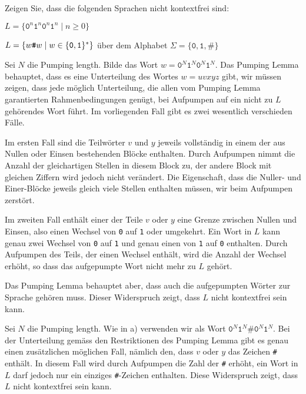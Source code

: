 Zeigen Sie, dass die folgenden Sprachen nicht kontextfrei sind:
\begin{teilaufgaben}
\item $L=\{\texttt{0}^n\texttt{1}^n\texttt{0}^n\texttt{1}^n\;|\;n\ge 0\}$
\item $L=\{w{\texttt{\#}}w\;|\;w\in\{{\tt 0},{\tt 1}\}^*\}$ über dem Alphabet
$\Sigma=\{\texttt{0},\texttt{1},\texttt{\#}\}$
\end{teilaufgaben}

\begin{loesung}
\begin{teilaufgaben}
\item Sei $N$ die Pumping length.
Bilde das Wort $w=\texttt{0}^N\texttt{1}^N\texttt{0}^N\texttt{1}^N$.
Das Pumping Lemma
behauptet, dass es eine Unterteilung des Wortes $w=uvxyz$ gibt, wir
müssen zeigen, dass jede möglich Unterteilung, die allen vom
Pumping Lemma garantierten Rahmenbedingungen genügt, bei Aufpumpen
auf ein nicht zu $L$ gehörendes Wort führt.
Im vorliegenden Fall
gibt es zwei wesentlich verschieden Fälle.

Im ersten Fall sind die
Teilwörter $v$ und $y$ jeweils vollständig in einem der aus Nullen
oder Einsen bestehenden Blöcke enthalten. Durch Aufpumpen nimmt die
Anzahl der gleichartigen Stellen in diesem Block zu, der andere Block
mit gleichen Ziffern wird jedoch nicht verändert.
Die Eigenschaft, dass die Nuller- und
Einer-Blöcke jeweils gleich viele Stellen enthalten müssen, wir
beim Aufpumpen zerstört.

Im zweiten Fall enthält einer der Teile $v$ oder $y$ eine
Grenze zwischen Nullen und Einsen, also einen Wechsel von
\texttt{0} auf \texttt{1} oder umgekehrt.
Ein Wort in $L$ kann
genau zwei Wechsel von \texttt{0} auf \texttt{1} und genau einen
von \texttt{1} auf \texttt{0} enthalten.
Durch Aufpumpen des Teils,
der einen Wechsel enthält, wird die Anzahl der Wechsel erhöht,
so dass das aufgepumpte Wort nicht mehr zu $L$ gehört.

Das Pumping Lemma behauptet aber, dass auch die aufgepumpten Wörter
zur Sprache gehören muss. Dieser Widerspruch zeigt, dass $L$
nicht kontextfrei sein kann.
\item Sei $N$ die Pumping length. Wie in a) verwenden wir als
Wort $\texttt{0}^N\texttt{1}^N\texttt{\#}\texttt{0}^N\texttt{1}^N$.
Bei der Unterteilung
gemäss den Restriktionen des Pumping Lemma gibt es genau einen zusätzlichen
möglichen Fall, nämlich den, dass $v$ oder $y$ das Zeichen {\tt\#}
enthält.
In diesem Fall wird durch Aufpumpen die Zahl der {\tt\#}
erhöht, ein Wort in $L$ darf jedoch nur ein einziges {\tt\#}-Zeichen
enthalten.
Diese Widerspruch zeigt, dass $L$ nicht kontextfrei sein kann.
\qedhere
\end{teilaufgaben}
\end{loesung}
